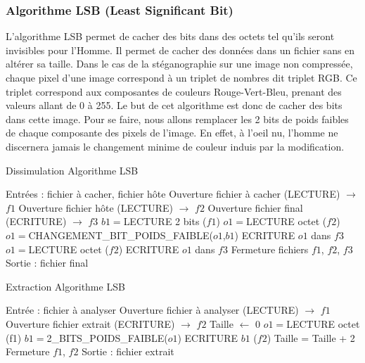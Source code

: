 \documentclass[11pt]{article}
\begin{document}
\subsubsection{Algorithme LSB (Least Significant Bit)}

L'algorithme LSB permet de cacher des bits dans des octets tel qu'ils seront
invisibles pour l'Homme. Il permet de cacher des données dans un fichier sans en
altérer sa taille. Dans le cas de la stéganographie sur une image non compressée,
chaque pixel d'une image correspond à un triplet de nombres dit triplet RGB. Ce
triplet correspond aux composantes de couleurs Rouge-Vert-Bleu, prenant des
valeurs allant de 0 à 255. Le but de cet algorithme est donc de cacher des bits 
dans cette image. Pour se faire, nous allons remplacer les 2 bits de poids 
faibles de chaque composante des pixels de l'image. En effet, à l'oeil nu, 
l'homme ne discernera jamais le changement minime de couleur induis par la 
modification. 

\begin{minipage}{.5\textwidth}
\begin{algorithm}[H]
\caption{Dissimulation Algorithme LSB}
\begin{algorithmic}
\color{green}
\STATE \footnotesize Entrées : fichier à cacher, fichier hôte
\color{black}
\STATE  Ouverture fichier à cacher (LECTURE) $\rightarrow$ $f1$
\STATE Ouverture fichier hôte (LECTURE) $\rightarrow$ $f2$
\STATE Ouverture fichier final (ECRITURE) $\rightarrow$ $f3$
\STATE $b1 = $LECTURE 2 bits ($f1$)
\STATE $o1 = $LECTURE octet ($f2$)
\STATE $o1 = $CHANGEMENT\_BIT\_POIDS\_FAIBLE($o1$,$b1$)
\STATE ECRITURE $o1$ dans $f3$
\ENDWHILE
{}
\STATE $o1 =$LECTURE octet ($f2$)
\STATE ECRITURE $o1$ dans $f3$
\ENDWHILE
\STATE Fermeture fichiers $f1$, $f2$, $f3$
\color{green}
\STATE Sortie : fichier final
\color{black}
\end{algorithmic}
\end{algorithm}
\normalsize
\end{minipage}
\begin{minipage}{.5\textwidth}
\begin{algorithm}[H]
\caption{Extraction Algorithme LSB}
\begin{algorithmic}
\color{green}
\STATE \footnotesize Entrée : fichier à analyser
\color{black}
\STATE Ouverture fichier à analyser (LECTURE) $\rightarrow$ $f1$
\STATE Ouverture fichier extrait (ECRITURE) $\rightarrow$ $f2$
\STATE Taille $\leftarrow$ 0
\STATE $o1 = $LECTURE octet (f1)
\STATE $b1 = $2\_BITS\_POIDS\_FAIBLE($o1$)
\STATE ECRITURE $b1$ ($f2$)
\STATE Taille = Taille + 2
\ENDWHILE
\STATE Fermeture $f1$, $f2$
\color{green}
\STATE Sortie : fichier extrait
\color{black}
\end{algorithmic}
\end{algorithm}
\normalsize
\end{minipage}
\end{document}
